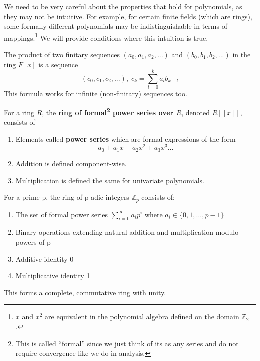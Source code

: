  We need to be very careful about the properties that hold for polynomials, as they may not be intuitive. For example, for certain finite fields (which are rings), some formally different polynomials may be indistinguishable in terms of mappings.\footnote{$x$ and $x^2$ are equivalent in the polynomial algebra defined on the domain $\mathbb{Z}_2$. } We will provide conditions where this intuition is true.  

  The product of two finitary sequences $(a_0, a_1, a_2, ...)$ and $(b_0, b_1, b_2, ...)$ in the ring $F[x]$ is a sequence 
  \begin{equation}
    (c_0, c_1, c_2, ...), \; c_k = \sum_{l = 0}^{k} a_l b_{k-l}
  \end{equation}
  This formula works for infinite (non-finitary) sequences too. 

  \begin{definition}
    For a ring $R$, the \textbf{ring of formal\footnote{This is called ``formal'' since we just think of its as any series and do not require convergence like we do in analysis.} power series over $R$}, denoted $R[[x]]$, consists of 
    \begin{enumerate}
      \item Elements called \textbf{power series} which are formal expressions of the form 
      \begin{equation}
        a_0 + a_1 x + a_2 x^2 + a_3 x^3...
      \end{equation}

      \item Addition is defined component-wise. 

      \item Multiplication is defined the same for univariate polynomials. 
    \end{enumerate}
  \end{definition}

  \begin{definition}
    For a prime p, the ring of p-adic integers $\mathbb{Z}_p$ consists of:
    \begin{enumerate}
      \item The set of formal power series $\sum_{i=0}^{\infty} a_i p^i$ where $a_i \in \{0,1,\dots,p-1\}$
      \item Binary operations extending natural addition and multiplication modulo powers of p
      \item Additive identity 0
      \item Multiplicative identity 1
    \end{enumerate}
    This forms a complete, commutative ring with unity.
  \end{definition}

